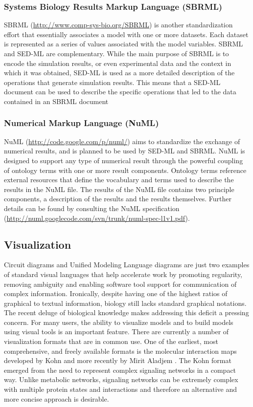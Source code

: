 \subsubsection{Systems Biology Results Markup Language (SBRML)}

SBRML (\url{http://www.comp-sys-bio.org/SBRML}) \autocite{dada2010sbrml}
is another standardization effort that essentially associates a model
with one or more datasets. Each dataset is represented as a series of
values associated with the model variables. SBRML and SED-ML are
complementary. While the main purpose of SBRML is to encode the
simulation results, or even experimental data and the context in which
it was obtained, SED-ML is used as a more detailed description of the
operations that generate simulation results. This means that a SED-ML
document can be used to describe the specific operations that led to the
data contained in an SBRML document

\subsubsection{Numerical Markup Language (NuML)}

NuML (\url{http://code.google.com/p/numl/}) aims to standardize the
exchange of numerical results, and is planned to be used by SED-ML and
SBRML. NuML is designed to support any type of numerical result through
the powerful coupling of ontology terms with one or more result
components. Ontology terms reference external resources that define the
vocabulary and terms used to describe the results in the NuML file. The
results of the NuML file contains two principle components, a
description of the results and the results themselves. Further details
can be found by consulting the NuML specification
(\url{http://numl.googlecode.com/svn/trunk/numl-spec-l1v1.pdf}).

\subsection{Visualization}

Circuit diagrams and Unified Modeling Language diagrams are just two
examples of standard visual languages that help accelerate work by
promoting regularity, removing ambiguity and enabling software tool
support for communication of complex information. Ironically, despite
having one of the highest ratios of graphical to textual information,
biology still lacks standard graphical notations. The recent deluge of
biological knowledge makes addressing this deficit a pressing concern.
For many users, the ability to visualize models and to build models
using visual tools is an important feature. There are currently a number
of visualization formats that are in common use. One of the earliest,
most comprehensive, and freely available formats is the molecular
interaction maps developed by Kohn \autocite{Kohn1999} and more recently
by Mirit Aladjem \autocite{Kohn2004}. The Kohn format emerged from the
need to represent complex signaling networks in a compact way. Unlike
metabolic networks, signaling networks can be extremely complex with
multiple protein states and interactions and therefore an alternative
and more concise approach is desirable.

